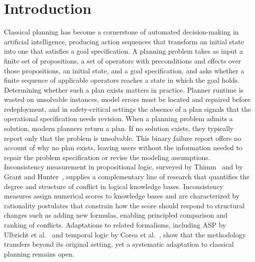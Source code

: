 \section{Introduction}
\label{sec:introduction}

Classical planning has become a cornerstone of automated decision-making in artificial intelligence, producing action sequences that transform an initial state into one that satisfies a goal specification. A planning problem takes as input a finite set of propositions, a set of operators with preconditions and effects over those propositions, an initial state, and a goal specification, and asks whether a finite sequence of applicable operators reaches a state in which the goal holds. Determining whether such a plan exists matters in practice. Planner runtime is wasted on unsolvable instances, model errors must be located and repaired before redeployment, and in safety-critical settings the absence of a plan signals that the operational specification needs revision. When a planning problem admits a solution, modern planners return a plan. If no solution exists, they typically report only that the problem is unsolvable. This binary failure report offers no account of why no plan exists, leaving users without the information needed to repair the problem specification or revise the modeling assumptions. Inconsistency measurement in propositional logic, surveyed by Thimm~\cite{Thimm2019} and by Grant and Hunter~\cite{Grant2023}, supplies a complementary line of research that quantifies the degree and structure of conflict in logical knowledge bases. Inconsistency measures assign numerical scores to knowledge bases and are characterized by rationality postulates that constrain how the score should respond to structural changes such as adding new formulas, enabling principled comparison and ranking of conflicts. Adaptations to related formalisms, including \ac{ASP} by Ulbricht et al.~\cite{Ulbricht2016} and temporal logic by Corea et al.~\cite{Corea2022}, show that the methodology transfers beyond its original setting, yet a systematic adaptation to classical planning remains open.

